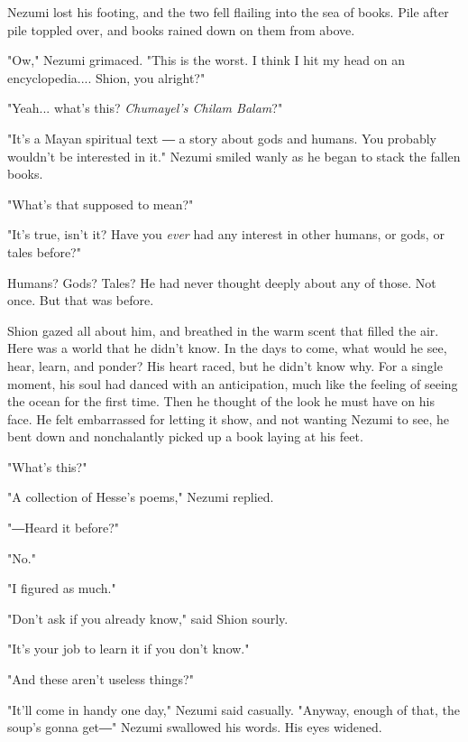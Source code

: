 Nezumi lost his footing, and the two fell flailing into the sea of
books. Pile after pile toppled over, and books rained down on them from
above.

"Ow," Nezumi grimaced. "This is the worst. I think I hit my head on an
encyclopedia.... Shion, you alright?"

"Yeah... what's this? \emph{Chumayel's Chilam Balam}?"

"It's a Mayan spiritual text ― a story about gods and humans. You
probably wouldn't be interested in it." Nezumi smiled wanly as he began
to stack the fallen books.

"What's that supposed to mean?"

"It's true, isn't it? Have you \emph{ever} had any interest in other humans, or
gods, or tales before?"

Humans? Gods? Tales? He had never thought deeply about any of those. Not
once. But that was before.

Shion gazed all about him, and breathed in the warm scent that filled
the air. Here was a world that he didn't know. In the days to come, what
would he see, hear, learn, and ponder? His heart raced, but he didn't
know why. For a single moment, his soul had danced with an anticipation,
much like the feeling of seeing the ocean for the first time. Then he
thought of the look he must have on his face. He felt embarrassed for
letting it show, and not wanting Nezumi to see, he bent down and
nonchalantly picked up a book laying at his feet.

"What's this?"

"A collection of Hesse's poems," Nezumi replied.


"―Heard it before?"

"No."

"I figured as much."

"Don't ask if you already know," said Shion sourly.

"It's your job to learn it if you don't know."

"And these aren't useless things?"

"It'll come in handy one day," Nezumi said casually. "Anyway, enough of
that, the soup's gonna get―" Nezumi swallowed his words. His eyes
widened.

